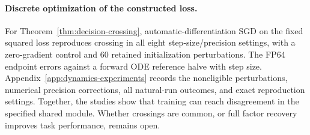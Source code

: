 \paragraph{Discrete optimization of the constructed loss.}
For Theorem~\ref{thm:decision-crossing}, automatic-differentiation SGD
on the fixed squared loss reproduces crossing in all eight step-size/precision
settings, with a zero-gradient control and 60 retained initialization
perturbations. The FP64 endpoint errors against a forward ODE reference
halve with step size. Appendix~\ref{app:dynamics-experiments} records the
noneligible perturbations, numerical precision corrections, all natural-run
outcomes, and exact reproduction settings. Together, the studies show that training can reach disagreement in the
specified shared module. Whether crossings are common, or full factor
recovery improves task performance, remains open.
